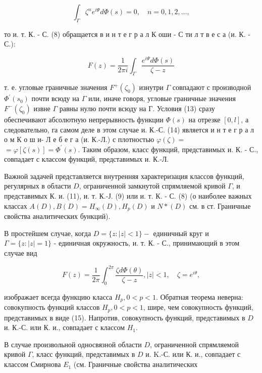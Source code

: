 \documentclass[10pt]{article}
\begin{document}
\[

\int_{\Gamma} \zeta^{n} e^{i \Psi} d \Phi(s)=0, \quad n=0,1,2, \ldots,

\]



то и. т. К. - С. (8) обращается в и н т е г р а л К оши - С ти л т в е с а (и. К. - С.):



\[

F(z)=\frac{1}{2 \pi i} \int_{\Gamma} \frac{e^{i \Psi} d \Phi(s)}{\zeta-z}

\]



т. е. угловые граничные значения $F^{+}\left(\zeta_{0}\right)$ изнутри $\Gamma$ совпадают с производной $\Phi^{\prime}\left(s_{0}\right)$ почти всюду на $\Gamma$ или, иначе говоря, угловые граничные значения $F^{-}\left(\zeta_{0}\right)$ извне $\Gamma$ равны нулю почти всюду на $Г$. Условия (13) сразу обеспечивают абсолютную непрерывность функции $\Phi(s)$ на отрезке $[0, l]$, а следовательно, га самом деле в этом случае и. К.-С. (14) является и н т е г р а л о м К о ш и- Л е б е г а (и. К.-Л.) с плотностью $\varphi(\zeta)=$ $=\varphi[\zeta(s)]=\Phi^{\prime}(s)$. Таким образом, класс функций, представимых и. К. - С., совпадает с классом функций, представимых и. К.-Л.



Важной задачей представляется внутренняя характеризация классов функций, регулярных в области $D$, ограниченной замкнутой спрямляемой кривой $\Gamma$, и представимых К. и. (11), и. т. К.-Ј. (9) или и. т. К. - С. (8) (о наиболее важных классах $A(D), B(D)=H_{\infty}(D), H_{p}(D)$ и $N *(D)$ см. в ст. Граничные свойства аналитических бункций).



В простейшем случае, когда $D=\{z:|z|<1\}-$ единичный круг и $\Gamma=\{z:|z|=1\}$ - единичная окружность, и. т. К. - С., принимающий в этом случае вид



\[

F(z)=\frac{1}{2 \pi} \int_{0}^{2 \pi} \frac{\zeta d \Phi(\theta)}{\zeta-z},|z|<1, \quad \zeta=e^{i \theta},

\]



изображает всегда функцию класса $H_{p}, 0<p<1$. Обратная теорема неверна: совокупность функций классов $H_{p}, 0<p<1$, шире, чем совокупность функций, представимых в виде (15). Напротив, совокупность функций, представимых в $D$ и. К.-С. или К. и., совпадает с классом $H_{1}$.



В случае произвольной односвязной области $D$, ограниченной спрямляемой кривой $\Gamma$, класс функций, представимых в $D$ и. K.-С. или К. и., совпадает с классом Смирнова $E_{1}$ (см. Граничные свойства аналитических
\end{document}
